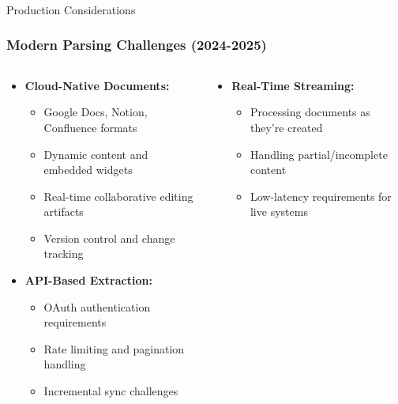\begin{frame}[fragile]\frametitle{}
\begin{center}
{\Large Production Considerations}

\end{center}
\end{frame}

\begin{frame}[fragile]\frametitle{Modern Parsing Challenges (2024-2025)}
\begin{columns}
    \begin{column}[T]{0.5\linewidth}
      \begin{itemize}
        \item \textbf{Cloud-Native Documents:}
        \begin{itemize}
            \item Google Docs, Notion, Confluence formats
            \item Dynamic content and embedded widgets
            \item Real-time collaborative editing artifacts
            \item Version control and change tracking
        \end{itemize}
        \item \textbf{API-Based Extraction:}
        \begin{itemize}
            \item OAuth authentication requirements
            \item Rate limiting and pagination handling
            \item Incremental sync challenges
        \end{itemize}
      \end{itemize}
    \end{column}
    \begin{column}[T]{0.5\linewidth}
      \begin{itemize}
        \item \textbf{Real-Time Streaming:}
        \begin{itemize}
            \item Processing documents as they're created
            \item Handling partial/incomplete content
            \item Low-latency requirements for live systems
        \end{itemize}

\end{itemize}
\end{column}
\end{columns}
\end{frame}
